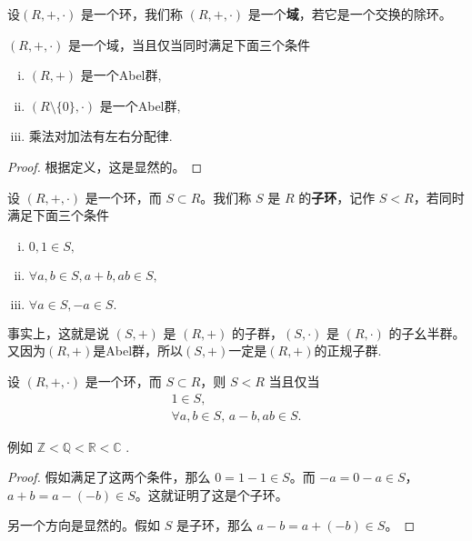 \documentclass[../../main.tex]{subfiles}
\begin{document}
\begin{definition}[域]
设$(R, +, \cdot)$ 是一个环，我们称 $(R, +, \cdot)$ 是一个\textbf{域}，若它是一个交换的除环。
\end{definition}

\begin{proposition}[域的充要条件]\label{proposition:域的充要条件}
$(R, +, \cdot)$ 是一个域，当且仅当同时满足下面三个条件
\begin{enumerate}[(i)]
\item $(R, +)$  是一个Abel群,

\item $(R\setminus\{0\}, \cdot)$ 是一个Abel群,

\item 乘法对加法有左右分配律.
\end{enumerate}
\end{proposition}
\begin{proof}
根据定义，这是显然的。
\end{proof}

\begin{definition}[子环]
设 $(R, +, \cdot)$ 是一个环，而 $S \subset R$。我们称 $S$ 是 $R$ 的\textbf{子环}，记作 $S < R$，若同时满足下面三个条件
\begin{enumerate}[(i)]
\item $0, 1 \in S,$

\item $\forall a, b \in S, a + b, ab \in S,$

\item $\forall a \in S, -a \in S.$
\end{enumerate}
\end{definition}
\begin{note}
事实上，这就是说 $(S, +)$ 是 $(R, +)$ 的子群，$(S, \cdot)$ 是 $(R, \cdot)$ 的子幺半群。 又因为$(R,+)$是Abel群，所以$(S,+)$一定是$(R,+)$的正规子群.
\end{note}

\begin{lemma}[子环的充要条件]\label{lemma:子环的充要条件}
设 $(R, +, \cdot)$ 是一个环，而 $S \subset R$，则 $S < R$ 当且仅当
\begin{gather*}
1 \in S ,\\
\forall a, b \in S, \, a - b, ab \in S .
\end{gather*}
\end{lemma}
\begin{note}
例如 $\mathbb{Z}< \mathbb{Q}< \mathbb{R}< \mathbb{C}$ . 
\end{note}
\begin{proof}
假如满足了这两个条件，那么 $0 = 1 - 1 \in S$。而 $-a = 0 - a \in S$，$a + b = a - (-b) \in S$。这就证明了这是个子环。

另一个方向是显然的。假如 $S$ 是子环，那么 $a - b = a + (-b) \in S$。
\end{proof}
\end{document}
